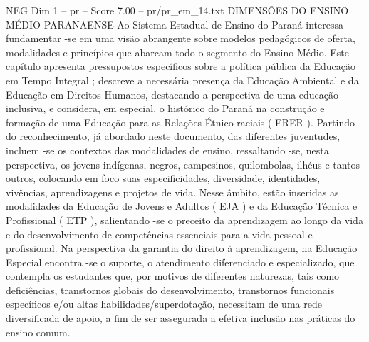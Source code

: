 \begin{textsample}{NEG Dim 1 – pr – Score 7.00 – pr/pr\_em\_14.txt}  \label{ex:f1_neg_267}
DIMENSÕES DO ENSINO MÉDIO PARANAENSE Ao Sistema Estadual de Ensino do Paraná interessa fundamentar -se em uma visão abrangente sobre modelos pedagógicos de oferta, modalidades e princípios que abarcam todo o segmento do Ensino Médio.
Este capítulo apresenta pressupostos específicos sobre a política pública da Educação em Tempo Integral ; descreve a necessária presença da Educação Ambiental e da Educação em Direitos Humanos, destacando a perspectiva de uma educação inclusiva, e considera, em especial, o histórico do Paraná na construção e formação de uma Educação para as Relações Étnico-raciais ( ERER ).
Partindo do reconhecimento, já abordado neste documento, das diferentes juventudes, incluem -se os contextos das modalidades de ensino, ressaltando -se, nesta perspectiva, os jovens indígenas, negros, campesinos, quilombolas, ilhéus e tantos outros, colocando em foco suas especificidades, diversidade, identidades, vivências, aprendizagens e projetos de vida.
Nesse âmbito, estão inseridas as modalidades da Educação de Jovens e Adultos ( EJA ) e da Educação Técnica e Profissional ( ETP ), salientando -se o preceito da aprendizagem ao longo da vida e do desenvolvimento de competências essenciais para a vida pessoal e profissional.
Na perspectiva da garantia do direito à aprendizagem, na Educação Especial encontra -se o suporte, o atendimento diferenciado e especializado, que contempla os estudantes que, por motivos de diferentes naturezas, tais como deficiências, transtornos globais do desenvolvimento, transtornos funcionais específicos e/ou altas habilidades/superdotação, necessitam de uma rede diversificada de apoio, a fim de ser assegurada a efetiva inclusão nas práticas do ensino comum.

\end{textsample}
